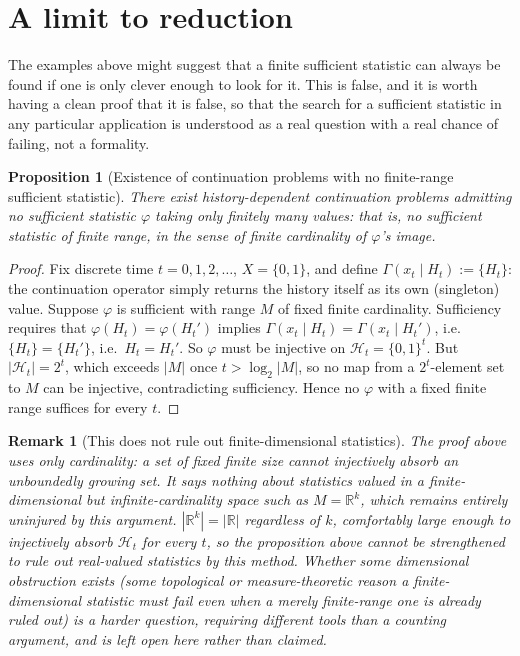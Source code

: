 \documentclass[11pt]{report}
\newtheorem{proposition}{Proposition}[chapter]
\newtheorem{remark}{Remark}[chapter]
\begin{document}
\section*{A limit to reduction}

The examples above might suggest that a finite sufficient statistic can
always be found if one is only clever enough to look for it. This is
false, and it is worth having a clean proof that it is false, so that
the search for a sufficient statistic in any particular application is
understood as a real question with a real chance of failing, not a
formality.

\begin{proposition}[Existence of continuation problems with no finite-range sufficient statistic]
There exist history-dependent continuation problems admitting no
sufficient statistic $\varphi$ taking only finitely many values:
that is, no sufficient statistic of finite \emph{range}, in the sense
of finite cardinality of $\varphi$'s image.
\end{proposition}
\begin{proof}
Fix discrete time $t = 0, 1, 2, \dots$, $X = \{0,1\}$, and define
$\Gamma(x_t \mid H_t) := \{H_t\}$: the continuation operator simply
returns the history itself as its own (singleton) value. Suppose
$\varphi$ is sufficient with range $M$ of fixed finite cardinality.
Sufficiency requires that $\varphi(H_t) = \varphi(H_t')$ implies
$\Gamma(x_t \mid H_t) = \Gamma(x_t \mid H_t')$, i.e.\ $\{H_t\} = \{H_t'\}$,
i.e.\ $H_t = H_t'$. So $\varphi$ must be injective on
$\mathcal{H}_t = \{0,1\}^t$. But $|\mathcal{H}_t| = 2^t$, which exceeds
$|M|$ once $t > \log_2 |M|$, so no map from a $2^t$-element set to $M$
can be injective, contradicting sufficiency. Hence no $\varphi$ with a
fixed finite range suffices for every $t$.
\end{proof}

\begin{remark}[This does not rule out finite-dimensional statistics]
The proof above uses only cardinality: a set of fixed finite size
cannot injectively absorb an unboundedly growing set. It says nothing
about statistics valued in a finite-\emph{dimensional} but
infinite-\emph{cardinality} space such as $M = \mathbb{R}^k$, which
remains entirely uninjured by this argument. $|\mathbb{R}^k| =
|\mathbb{R}|$ regardless of $k$, comfortably large enough to injectively
absorb $\mathcal{H}_t$ for every $t$, so the proposition above cannot be
strengthened to rule out real-valued statistics by this method. Whether
some dimensional obstruction exists (some topological or
measure-theoretic reason a finite-dimensional statistic must fail even
when a merely finite-range one is already ruled out) is a harder
question, requiring different tools than a counting argument, and is
left open here rather than claimed.
\end{remark}
\end{document}
